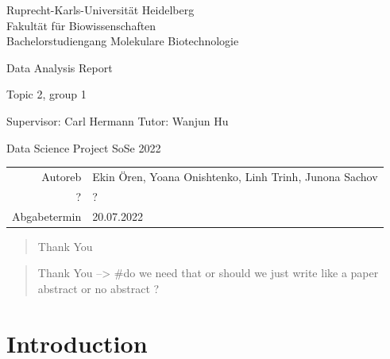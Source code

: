 \documentclass[
  parskip,
  oneside]{scrreprt}
\author{}
\date{\vspace{-2.5em}}
\begin{document}
\begin{titlepage}
\centering
    {\Large Ruprecht-Karls-Universität Heidelberg\\
        Fakultät für Biowissenschaften\\
        Bachelorstudiengang Molekulare Biotechnologie\\}

    {}
    {

    {\Huge Data Analysis Report}

        {\Huge Topic 2, group 1}

        {\Huge Supervisor: Carl Hermann}
        {\Huge Tutor: Wanjun Hu}

    }

    {\Large Data Science Project SoSe 2022}


    {\Large
        \begin{tabular}{rl}
            Autoreb & Ekin Ören, Yoana Onishtenko, Linh Trinh, Junona Sachov\\
            ? & ?\\
            Abgabetermin &20.07.2022\\
        \end{tabular}
    }


\end{titlepage}

\tableofcontents

\renewcommand\abstractname{\Large Acknowledgments}
\begin{abstract}
Thank You
\end{abstract}

\renewcommand\abstractname{\Large Acknowledgments}
\begin{abstract}

Thank You --> #do we need that or should we just write like a paper abstract or no abstract ?

\end{abstract}

\hypertarget{introduction}{%
\chapter{Introduction}\label{introduction}}
\end{document}
